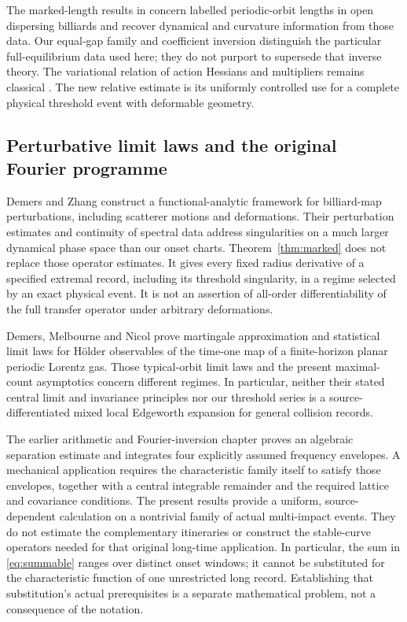 The marked-length results in \cite{BDKL} concern labelled periodic-orbit
lengths in open dispersing billiards and recover dynamical and curvature
information from those data. Our equal-gap family and coefficient
inversion distinguish the particular full-equilibrium data used here;
they do not purport to supersede that inverse theory. The variational
relation of action Hessians and multipliers remains classical
\cite{Hill}. The new relative estimate is its uniformly controlled use
for a complete physical threshold event with deformable geometry.

\subsection{Perturbative limit laws and the original Fourier programme}
Demers and Zhang \cite{DemersZhang} construct a functional-analytic
framework for billiard-map perturbations, including scatterer motions and
deformations. Their perturbation estimates and continuity of spectral
data address singularities on a much larger dynamical phase space than
our onset charts. Theorem~\ref{thm:marked} does not replace those operator
estimates. It gives every fixed radius derivative of a specified extremal
record, including its threshold singularity, in a regime selected by an
exact physical event. It is not an assertion of all-order differentiability
of the full transfer operator under arbitrary deformations.

Demers, Melbourne and Nicol \cite{DMN} prove martingale approximation and
statistical limit laws for H\"older observables of the time-one map of a
finite-horizon planar periodic Lorentz gas. Those typical-orbit limit laws
and the present maximal-count asymptotics concern different regimes.
In particular, neither their stated central limit and invariance principles
nor our threshold series is a source-differentiated mixed local Edgeworth
expansion for general collision records.

The earlier arithmetic and Fourier-inversion chapter \cite{A2R33} proves
an algebraic separation estimate and integrates four explicitly assumed
frequency envelopes. A mechanical application requires the characteristic
family itself to satisfy those envelopes, together with a central
integrable remainder and the required lattice and covariance conditions.
The present results provide a uniform, source-dependent calculation on a
nontrivial family of actual multi-impact events. They do not estimate the
complementary itineraries or construct the stable-curve operators needed
for that original long-time application. In particular, the sum in
\eqref{eq:summable} ranges over distinct onset windows; it cannot be
substituted for the characteristic function of one unrestricted long
record. Establishing that substitution's actual prerequisites is a
separate mathematical problem, not a consequence of the notation.

